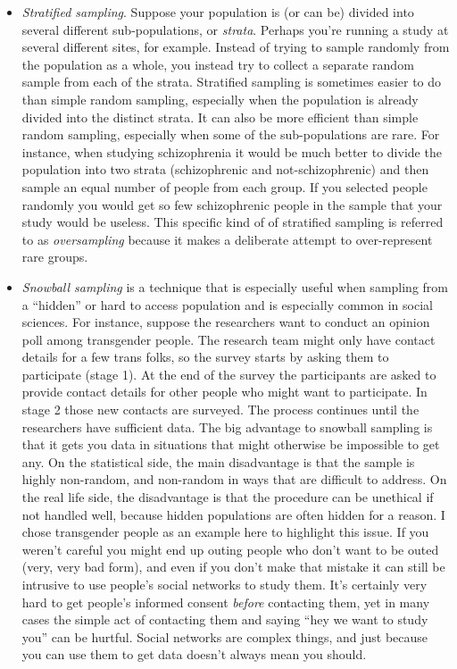 \begin{itemize} 
\item {\it Stratified sampling}. Suppose your population is (or can be) divided into several different sub-populations, or {\it strata}. Perhaps you're running a study at several different sites, for example. Instead of trying to sample randomly from the population as a whole, you instead try to collect a separate random sample from each of the strata. Stratified sampling is sometimes easier to do than simple random sampling, especially when the population is already divided into the distinct strata. It can also be more efficient than simple random sampling, especially when some of the sub-populations are rare. For instance, when studying schizophrenia it would be much better to divide the population into two strata (schizophrenic and not-schizophrenic) and then sample an equal number of people from each group. If you selected people randomly you would get so few schizophrenic people in the sample that your study would be useless. This specific kind of of stratified sampling is referred to as {\it oversampling} because it makes a deliberate attempt to over-represent rare groups. 
\item {\it Snowball sampling} is a technique that is especially useful when sampling from a ``hidden'' or hard to access population and is especially common in social sciences. For instance, suppose the researchers want to conduct an opinion poll among transgender people. The research team might only have contact details for a few trans folks, so the survey starts by asking them to participate (stage 1). At the end of the survey the participants are asked to provide contact details for other people who might want to participate. In stage 2 those new contacts are surveyed. The process continues until the researchers have sufficient data. The big advantage to snowball sampling is that it gets you data in situations that might otherwise be impossible to get any. On the statistical side, the main disadvantage is that the sample is highly non-random, and non-random in ways that are difficult to address. On the real life side, the disadvantage is that the procedure can be unethical if not handled well, because hidden populations are often hidden for a reason. I chose transgender people as an example here to highlight this issue. If you weren't careful you might end up outing people who don't want to be outed (very, very bad form), and even if you don't make that mistake it can still be intrusive to use people's social networks to study them. It's certainly very hard to get people's informed consent {\it before} contacting them, yet in many cases the simple act of contacting them and saying ``hey we want to study you'' can be hurtful. Social networks are complex things, and just because you can use them to get data doesn't always mean you should.

\end{itemize}
